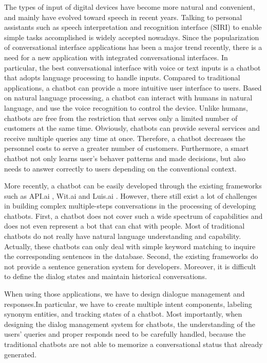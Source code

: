 The types of input of digital devices have become more natural and convenient, and mainly have evolved toward speech in recent years. Talking to personal assistants such as speech interpretation and recognition interface (SIRI) \cite{SIRI} to enable simple tasks accomplished is widely accepted nowadays. Since the popularization of conversational interface applications has been a major trend recently, there is a need for a new application with integrated conversational interfaces.
In particular, the best conversational interface  with voice or text inputs is a chatbot that adopts language processing to handle inputs. Compared to traditional applications, a chatbot can provide a more intuitive user interface to users. Based on natural language processing, a chatbot can interact with humans in natural language, and use the voice recognition to control the device. Unlike humans, chatbots are free from the restriction that serves only a limited number of customers at the same time. Obviously, chatbots can provide several services and receive multiple queries any time at once. Therefore, a chatbot decreases the personnel costs to serve a greater number of customers. Furthermore, a smart chatbot not only learns user’s behaver patterns and made decisions, but also needs to answer correctly to users depending on the conventional context.

More recently, a chatbot can be easily developed through the existing frameworks such as API.ai \cite{dialogflow}, Wit.ai \cite{wit.ai} and Luis.ai \cite{LUIS}. However, there still exist a lot of challenges in building complex multiple-steps conversations in the processing of developing chatbots. First, a chatbot does not cover such a wide spectrum of capabilities and does not even represent a bot that can chat with people. Most of traditional chatbots do not really have natural language understanding and capability. Actually, these chatbots can only deal with simple keyword matching to inquire the corresponding sentences in the database. Second, the existing frameworks do not provide a sentence generation system for developers. Moreover, it is difficult to define the dialog states and maintain historical conversations.


When using those applications, we have to design dialogue management and responses.In particular, we have to create multiple intent components, labeling synonym entities, and tracking states of a chatbot. Most importantly, when designing the dialog management system for chatbots, the understanding of the users’ queries and proper responds need to be carefully handled, because the traditional chatbots are not able to memorize a conversational status that already  generated.


